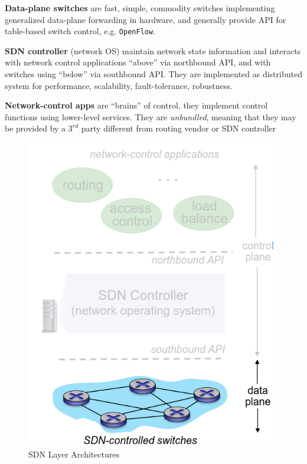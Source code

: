 \begin{paracol}{2}
   \textbf{Data-plane switches} are fast, simple, commodity switches implementing generalized data-plane forwarding in hardware, and generally provide API for table-based switch control, e.g. \texttt{OpenFlow}.

   \textbf{SDN controller} (network OS) maintain network state information and interacts with network control applications ``above'' via northbound API, and with switches using ``below'' via southbound API.
   They are implemented as distributed system for performance, scalability, fault-tolerance, robustness.

   \textbf{Network-control apps} are ``brains'' of control, they implement control functions using lower-level services. They are \textit{unbundled}, meaning that they may be provided by a $3^{rd}$ party different from routing vendor or SDN controller
   \switchcolumn
   \begin{figure}[htbp]
      \centering
      \includegraphics{images/sdn_planes3.png}
      \caption{SDN Layer Architectures}
      \label{fig:sdn_planes3}
   \end{figure}
\end{paracol}